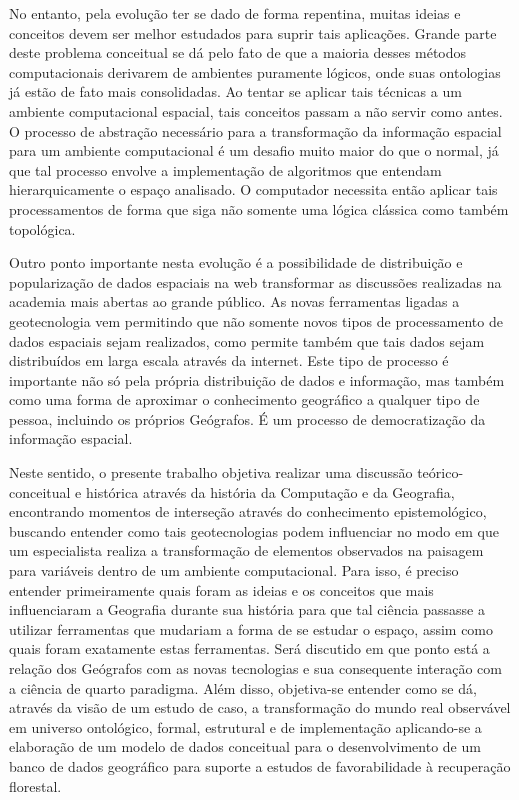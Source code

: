 No entanto, pela evolução ter se dado de forma repentina, muitas ideias e conceitos devem ser melhor estudados para suprir tais aplicações. Grande parte deste problema conceitual se dá pelo fato de que a maioria desses métodos computacionais derivarem de ambientes puramente lógicos, onde suas ontologias já estão de fato mais consolidadas. Ao tentar se aplicar tais técnicas a um ambiente computacional espacial, tais conceitos passam a não servir como antes. O processo de abstração necessário para a transformação da informação espacial para um ambiente computacional é um desafio muito maior do que o normal, já que tal processo envolve a implementação de algoritmos que entendam hierarquicamente o espaço analisado. O computador necessita então aplicar tais processamentos de forma que siga não somente uma lógica clássica como também topológica. \par
Outro ponto importante nesta evolução é a possibilidade de distribuição e popularização de dados espaciais na web transformar as discussões realizadas na academia mais abertas ao grande público. As novas ferramentas ligadas a geotecnologia vem permitindo que não somente novos tipos de processamento de dados espaciais sejam realizados, como permite também que tais dados sejam distribuídos em larga escala através da internet. Este tipo de processo é importante não só pela própria distribuição de dados e informação, mas também como uma forma de aproximar o conhecimento geográfico a qualquer tipo de pessoa, incluindo os próprios Geógrafos. É um processo de democratização da informação espacial. \par
Neste sentido, o presente trabalho objetiva realizar uma discussão teórico-conceitual e histórica através da história da Computação e da Geografia, encontrando momentos de interseção através do conhecimento epistemológico, buscando entender como tais geotecnologias podem influenciar no modo em que um especialista realiza a transformação de elementos observados na paisagem para variáveis dentro de um ambiente computacional. Para isso, é preciso entender primeiramente quais foram as ideias e os conceitos que mais influenciaram a Geografia durante sua história para que tal ciência passasse a utilizar ferramentas que mudariam a forma de se estudar o espaço, assim como quais foram exatamente estas ferramentas. Será discutido em que ponto está a relação dos Geógrafos com as novas tecnologias e sua consequente interação com a ciência de quarto paradigma. Além disso, objetiva-se entender como se dá, através da visão de um estudo de caso, a transformação do mundo real observável em universo ontológico, formal, estrutural e de implementação aplicando-se a elaboração de um modelo de dados conceitual para o desenvolvimento de um banco de dados geográfico para suporte a estudos de favorabilidade à recuperação florestal. \par
